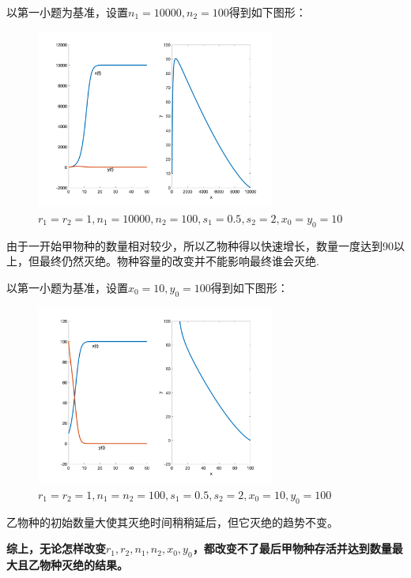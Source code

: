 \documentclass{article}
\begin{document}
以第一小题为基准，设置$n_1=10000,n_2=100$得到如下图形：
\begin{figure}[H]
    \centering
    \includegraphics[width=0.7\textwidth]{pic93.png}
    \caption{$r_1=r_2=1, n_1=10000, n_2=100, s_1=0.5, s_2=2, x_0=y_0=10$}
\end{figure}
由于一开始甲物种的数量相对较少，所以乙物种得以快速增长，数量一度达到90以上，但最终仍然灭绝。物种容量的改变并不能影响最终谁会灭绝.

以第一小题为基准，设置$x_0=10,y_0=100$得到如下图形：
\begin{figure}[H]
    \centering
    \includegraphics[width=0.7\textwidth]{pic94.png}
    \caption{$r_1=r_2=1, n_1=n_2=100, s_1=0.5, s_2=2, x_0=10, y_0=100$}
\end{figure}
乙物种的初始数量大使其灭绝时间稍稍延后，但它灭绝的趋势不变。

\textbf{综上，无论怎样改变$r_1,r_2,n_1,n_2,x_0,y_0$，都改变不了最后甲物种存活并达到数量最大且乙物种灭绝的结果。}
\end{document}
